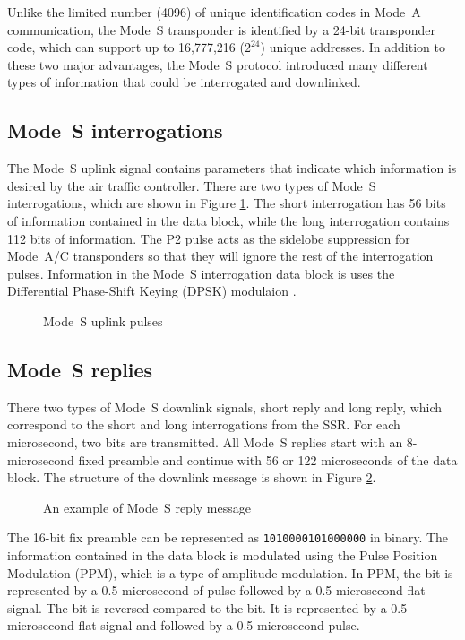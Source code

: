 Unlike the limited number (4096) of unique identification codes in Mode~A communication, the Mode~S transponder is identified by a 24-bit transponder code, which can support up to 16,777,216 ($2^{24}$) unique addresses. In addition to these two major advantages, the Mode~S protocol introduced many different types of information that could be interrogated and downlinked.

\subsection{Mode~S interrogations}
The Mode~S uplink signal contains parameters that indicate which information is desired by the air traffic controller. There are two types of Mode~S interrogations, which are shown in Figure \ref{fig:mode_s_uplink_pulses}. The short interrogation has 56 bits of information contained in the data block, while the long interrogation contains 112 bits of information. The P2 pulse acts as the sidelobe suppression for Mode~A/C transponders so that they will ignore the rest of the interrogation pulses. Information in the Mode~S interrogation data block is uses the Differential Phase-Shift Keying (DPSK) modulaion \cite{mazda2014}.

\begin{figure}[ht]
  \scalebox{0.9}{
    
  }
  \caption{Mode~S uplink pulses}
  \label{fig:mode_s_uplink_pulses}
\end{figure}


\subsection{Mode~S replies}
There two types of Mode~S downlink signals, short reply and long reply, which correspond to the short and long interrogations from the SSR. For each microsecond, two bits are transmitted. All Mode~S replies start with an 8-microsecond fixed preamble and continue with 56 or 122 microseconds of the data block. The structure of the downlink message is shown in Figure \ref{fig:mode_s_downlink_pulses}.

\begin{figure}[ht]
  \scalebox{0.9}{
    
  }
  \caption{An example of Mode~S reply message}
  \label{fig:mode_s_downlink_pulses}
\end{figure}

The 16-bit fix preamble can be represented as \texttt{1010000101000000} in binary. The information contained in the data block is modulated using the Pulse Position Modulation (PPM), which is a type of amplitude modulation. In PPM, the \1 bit is represented by a 0.5-microsecond of pulse followed by a 0.5-microsecond flat signal. The \0 bit is reversed compared to the \1 bit. It is represented by a 0.5-microsecond flat signal and followed by a 0.5-microsecond pulse.

